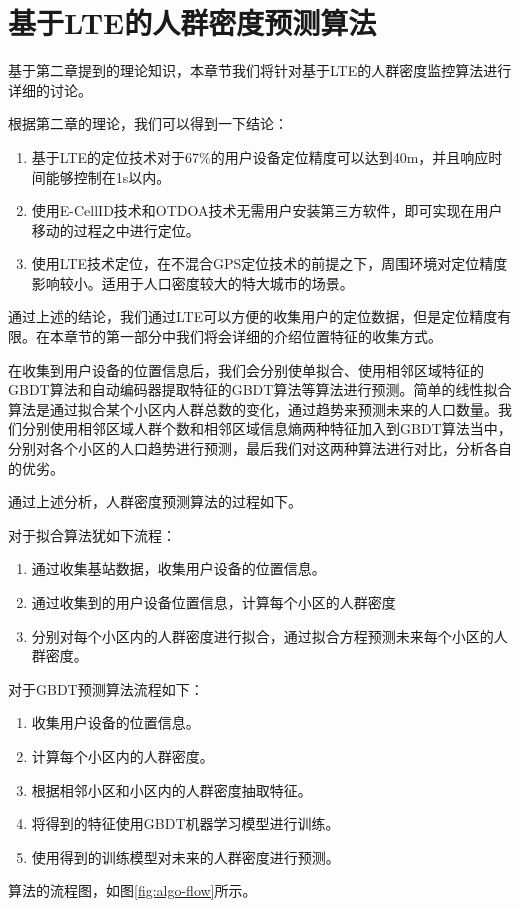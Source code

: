 \chapter{基于LTE的人群密度预测算法}
\label{chap:algorithm}

基于第二章提到的理论知识，本章节我们将针对基于LTE的人群密度监控算法进行详细的讨论。

根据第二章的理论，我们可以得到一下结论：

\begin{enumerate}
    \item 基于LTE的定位技术对于67\%的用户设备定位精度可以达到40m，并且响应时间能够控制在1s以内。
    \item 使用E-CellID技术和OTDOA技术无需用户安装第三方软件，即可实现在用户移动的过程之中进行定位。
    \item 使用LTE技术定位，在不混合GPS定位技术的前提之下，周围环境对定位精度影响较小。适用于人口密度较大的特大城市的场景。
\end{enumerate}
通过上述的结论，我们通过LTE可以方便的收集用户的定位数据，但是定位精度有限。在本章节的第一部分中我们将会详细的介绍位置特征的收集方式。

在收集到用户设备的位置信息后，我们会分别使单拟合、使用相邻区域特征的GBDT算法和自动编码器提取特征的GBDT算法等算法进行预测。简单的线性拟合算法是通过拟合某个小区内人群总数的变化，通过趋势来预测未来的人口数量。我们分别使用相邻区域人群个数和相邻区域信息熵两种特征加入到GBDT算法当中，分别对各个小区的人口趋势进行预测，最后我们对这两种算法进行对比，分析各自的优劣。

通过上述分析，人群密度预测算法的过程如下。

对于拟合算法犹如下流程：
\begin{enumerate}
    \item 通过收集基站数据，收集用户设备的位置信息。
    \item 通过收集到的用户设备位置信息，计算每个小区的人群密度
    \item 分别对每个小区内的人群密度进行拟合，通过拟合方程预测未来每个小区的人群密度。
\end{enumerate}

对于GBDT预测算法流程如下：
\begin{enumerate}
    \item 收集用户设备的位置信息。
    \item 计算每个小区内的人群密度。
    \item 根据相邻小区和小区内的人群密度抽取特征。
    \item 将得到的特征使用GBDT机器学习模型进行训练。
    \item 使用得到的训练模型对未来的人群密度进行预测。
\end{enumerate}
算法的流程图，如图\ref{fig:algo-flow}所示。

